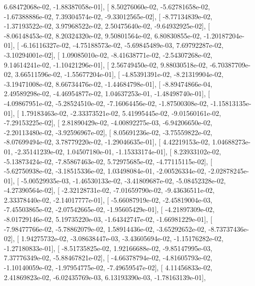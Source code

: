 \documentclass{article}
\begin{document}
          6.68472068e-02,  -1.88387058e-01],
       [  8.50276060e-02,  -5.62781658e-02,  -1.67388886e-02,
          7.39304574e-02,  -9.33012565e-02],
       [ -8.77134839e-02,  -1.37193522e-02,   3.97968522e-02,
          2.50475640e-02,  -9.64932925e-02],
       [ -8.06148453e-02,   8.20324320e-02,   9.50801564e-02,
          6.80830855e-02,  -1.20187204e-01],
       [ -6.16116327e-02,  -4.75188573e-02,  -5.69845489e-03,
          7.69792287e-02,  -3.10294001e-02],
       [  1.09085010e-02,  -8.41638771e-02,  -2.54307268e-02,
          9.14614241e-02,  -1.10421296e-01],
       [  2.56749450e-02,   9.88030518e-02,  -6.70387709e-02,
          3.66511596e-02,  -1.55677204e-01],
       [ -4.85391391e-02,  -8.21319904e-02,  -3.19471008e-02,
          8.66734476e-02,  -1.44684798e-01],
       [ -8.89474866e-04,   2.49589298e-02,  -4.46954877e-02,
          1.04637253e-01,  -1.48498740e-01],
       [ -4.09867951e-02,  -5.28524510e-02,  -7.16064456e-02,
         -1.87500308e-02,  -1.15813135e-01],
       [  1.79183463e-02,  -2.33373521e-02,   5.41995445e-02,
         -9.01560161e-02,  -7.29153225e-02],
       [  2.81890429e-02,  -4.00892275e-03,  -6.94206650e-02,
         -2.20113480e-02,  -3.92596967e-02],
       [  8.05691236e-02,  -3.75559822e-02,  -8.07699494e-02,
          3.78779220e-02,  -1.29046635e-01],
       [  4.42219153e-02,   1.04688273e-01,  -2.35141239e-02,
          1.04507180e-01,  -1.15333174e-01],
       [  8.23933102e-02,  -5.13873424e-02,  -7.85867463e-02,
          5.72975685e-02,  -4.77115115e-02],
       [ -5.62750938e-02,  -3.18515336e-02,   1.03498084e-01,
         -2.00526334e-02,  -2.02878245e-01],
       [ -5.00529935e-03,  -1.46530133e-02,  -3.41809687e-02,
         -5.08452328e-02,  -4.27390564e-02],
       [ -2.32128731e-02,  -7.01659790e-02,  -9.43636511e-02,
          2.33378440e-02,  -2.14017777e-01],
       [ -5.66087919e-02,  -2.45819004e-03,  -7.45503865e-02,
         -2.07542665e-02,  -1.95605429e-01],
       [ -4.21897309e-02,  -8.01729146e-02,   5.19735220e-03,
         -1.64342747e-02,  -1.66981229e-01],
       [ -7.98477766e-02,  -5.78862079e-02,   1.58914436e-02,
         -3.65292652e-02,  -8.73737436e-02],
       [  1.94275732e-02,  -3.08638447e-03,  -3.43605694e-02,
         -1.15176282e-02,  -1.27180833e-01],
       [ -8.51735825e-02,   1.92166688e-02,  -9.85147995e-03,
          7.37776349e-02,  -5.88467821e-02],
       [ -4.66378794e-02,  -4.81605793e-02,  -1.10140059e-02,
         -1.97954775e-02,  -7.49659547e-02],
       [  4.11456833e-02,   2.41869823e-02,  -6.02435769e-03,
          6.13193390e-03,  -1.78163139e-01],
\end{document}
